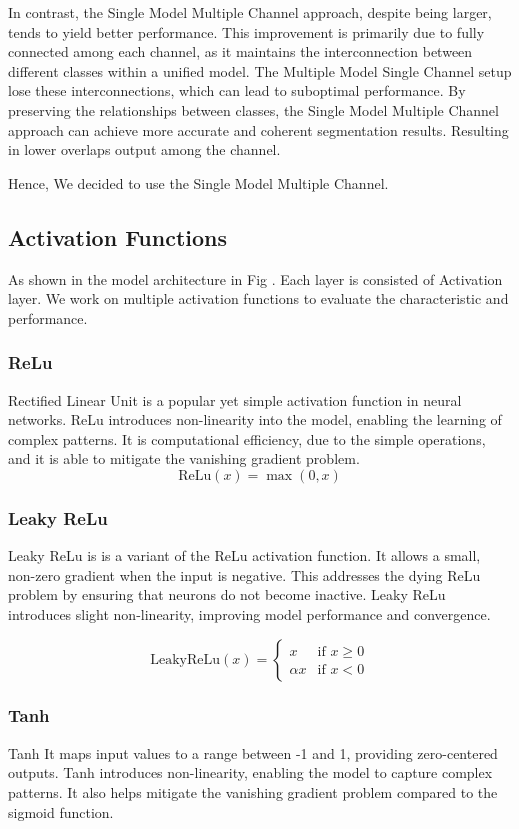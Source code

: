 \documentclass[conference]{IEEEtran}
\begin{document}
In contrast, the Single Model Multiple Channel approach, despite being larger, tends to yield better performance. This improvement is primarily due to fully connected among each channel, as it maintains the interconnection between different classes within a unified model. The Multiple Model Single Channel setup lose these interconnections, which can lead to suboptimal performance. By preserving the relationships between classes, the Single Model Multiple Channel approach can achieve more accurate and coherent segmentation results. Resulting in lower overlaps output among the channel.

Hence, We decided to use the Single Model Multiple Channel.
\subsection{Activation Functions}

As shown in the model architecture in Fig . Each layer is consisted of Activation layer. We work on multiple activation functions to evaluate the characteristic and performance.

\subsubsection{ReLu}
Rectified Linear Unit is a popular yet simple activation function in neural networks. ReLu introduces non-linearity into the model, enabling the learning of complex patterns. It is computational efficiency, due to the simple operations, and it is able to mitigate the vanishing gradient problem.
\[
\text{ReLu}(x) = \max(0, x)
\]

\subsubsection{Leaky ReLu}
Leaky ReLu is is a variant of the ReLu activation function. It allows a small, non-zero gradient when the input is negative. This addresses the dying ReLu problem by ensuring that neurons do not become inactive. Leaky ReLu introduces slight non-linearity, improving model performance and convergence.

\[
\text{LeakyReLu}(x) = 
\begin{cases} 
x & \text{if } x \geq 0 \\
\alpha x & \text{if } x < 0 
\end{cases}
\]

\subsubsection{Tanh}
Tanh It maps input values to a range between -1 and 1, providing zero-centered outputs. Tanh introduces non-linearity, enabling the model to capture complex patterns. It also helps mitigate the vanishing gradient problem compared to the sigmoid function.
\end{document}

